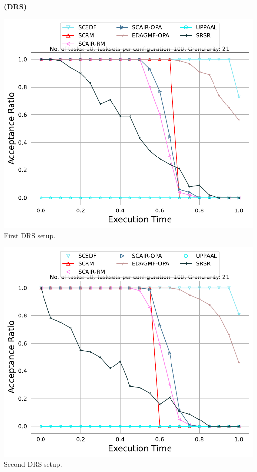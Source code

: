 \documentclass[]{article}
\begin{document}
	\begin{minipage}[t]{0.48\linewidth}
		\centering
		\textbf{(DRS)}
		\vspace{0.3cm}
		
		\includegraphics[width=\linewidth]{EFFSSTS_drs_1st[21][0.01-0.1][10].pdf}
		First DRS setup.
		\vspace{0.3cm}
		
		\includegraphics[width=\linewidth]{EFFSSTS_drs_2nd[21][0.01-0.1][10].pdf}
		Second DRS setup.
		\vspace{0.3cm}

                   

	\end{minipage}
\end{document}
